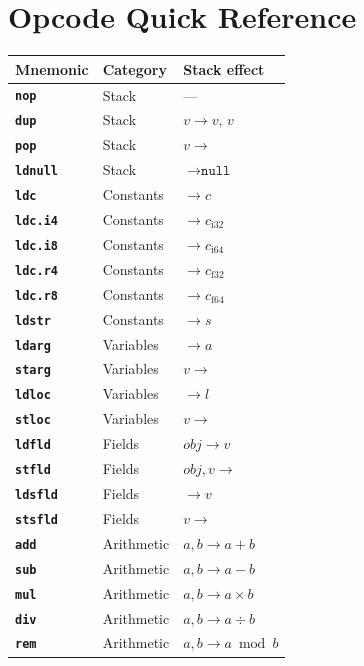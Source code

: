 \documentclass[11pt,a4paper]{article}
\newcommand{\opcode}[1]{\textbf{\texttt{#1}}}
\begin{document}
\section{Opcode Quick Reference}
\label{app:opcodes}

\begin{longtable}{lll}
  \toprule
  \textbf{Mnemonic} & \textbf{Category} & \textbf{Stack effect} \\
  \midrule
  \endhead
  \opcode{nop}       & Stack      & --- \\
  \opcode{dup}       & Stack      & $v \to v,\, v$ \\
  \opcode{pop}       & Stack      & $v \to$ \\
  \opcode{ldnull}    & Stack      & $\to \texttt{null}$ \\
  \opcode{ldc}       & Constants  & $\to c$ \\
  \opcode{ldc.i4}    & Constants  & $\to c_{\text{i32}}$ \\
  \opcode{ldc.i8}    & Constants  & $\to c_{\text{i64}}$ \\
  \opcode{ldc.r4}    & Constants  & $\to c_{\text{f32}}$ \\
  \opcode{ldc.r8}    & Constants  & $\to c_{\text{f64}}$ \\
  \opcode{ldstr}     & Constants  & $\to s$ \\
  \opcode{ldarg}     & Variables  & $\to a$ \\
  \opcode{starg}     & Variables  & $v \to$ \\
  \opcode{ldloc}     & Variables  & $\to l$ \\
  \opcode{stloc}     & Variables  & $v \to$ \\
  \opcode{ldfld}     & Fields     & $\mathit{obj} \to v$ \\
  \opcode{stfld}     & Fields     & $\mathit{obj}, v \to$ \\
  \opcode{ldsfld}    & Fields     & $\to v$ \\
  \opcode{stsfld}    & Fields     & $v \to$ \\
  \opcode{add}       & Arithmetic & $a, b \to a{+}b$ \\
  \opcode{sub}       & Arithmetic & $a, b \to a{-}b$ \\
  \opcode{mul}       & Arithmetic & $a, b \to a{\times}b$ \\
  \opcode{div}       & Arithmetic & $a, b \to a{\div}b$ \\
  \opcode{rem}       & Arithmetic & $a, b \to a \bmod b$ \\

\end{longtable}
\end{document}
